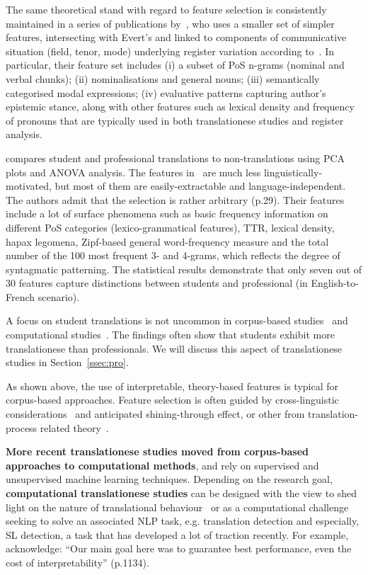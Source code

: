 The same theoretical stand with regard to feature selection is consistently maintained in a series of publications by~\citet{Lapshinova2015,Lapshinova2017}, who uses a smaller set of simpler features, intersecting with Evert's and linked to components of communicative situation (field, tenor, mode) underlying register variation according to~\citet{Halliday1989}. In particular, their feature set includes (i) a subset of PoS n-grams (nominal and verbal chunks); (ii) nominalisations and general nouns; (iii) semantically categorised modal expressions; (iv) evaluative patterns capturing author's epistemic stance, along with other features such as lexical density and frequency of pronouns that are typically used in both translationese studies and register analysis.

\citet{Sutter2017} compares student and professional translations to non-translations using \gls{PCA} plots and \gls{ANOVA} analysis. The features in~\citet{Sutter2017} are much less linguistically-motivated, but most of them are easily-extractable and language-independent. The authors admit that the selection is rather arbitrary (p.29). \hypertarget{wd:sutters}{Their features} include a lot of surface phenomena such as basic frequency information on different PoS categories (lexico-grammatical features), TTR, lexical density, hapax legomena, Zipf-based general word-frequency measure and the total number of the 100 most frequent 3- and 4-grams, which reflects the degree of syntagmatic patterning. The statistical results demonstrate that only seven out of 30 features capture distinctions between students and professional (in English-to-French scenario).

A focus on student translations is not uncommon in corpus-based studies~\cite{Nakamura2007,Rabadan2009, Castagnoli2009,Sutter2017,Kunilovskaya2018profiles} and computational studies~\cite{Ilisei2010,Lapshinova2019,Bizzoni2021}. The findings often show that students exhibit more translationese than professionals. We will discuss this aspect of translationese studies in Section~\ref{ssec:pro}.

As shown above, the use of interpretable, theory-based features is typical for corpus-based approaches. Feature selection is often guided by cross-linguistic considerations~\cite[as in][]{Santos1995,Evert2017,Cappelle2017} and anticipated shining-through effect, or other from translation-process related theory~\cite{Redelinghuys2015,Redelinghuys2016,Delaere2015}. 

\textbf{More recent translationese studies moved from corpus-based approaches to computational methods}, and rely on supervised and unsupervised machine learning techniques. 
Depending on the research goal, \textbf{computational translationese studies} can be designed with the view to shed light on the nature of translational behaviour~\cite[see, for example, ][]{Corpas2008,Ilisei2010} or as a computational challenge seeking to solve an associated NLP task, e.g. translation detection and especially, SL detection, a task that has developed a lot of traction recently. For example, \citet{Sominsky2019} acknowledge: ``Our main goal here was to guarantee best performance, even the cost of interpretability'' (p.1134).

